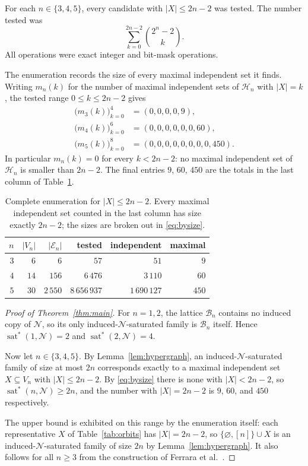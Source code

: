 \documentclass[11pt]{amsart}
\newcommand{\Bn}{\mathcal B_n}
\newcommand{\Nposet}{\mathcal N}
\newcommand{\satstar}{\operatorname{sat}^{*}}
\begin{document}
For each $n\in\{3,4,5\}$, every candidate with $|X|\leq 2n-2$ was tested.
The number tested was
\[
\sum_{k=0}^{2n-2}\binom{2^n-2}{k}.
\]
All operations were exact integer and bit-mask operations.

The enumeration records the size of every maximal independent set it finds.
Writing $m_n(k)$ for the number of maximal independent sets of $\mathcal H_n$
with $|X|=k$, the tested range $0\leq k\leq 2n-2$ gives
\begin{equation}\label{eq:bysize}
\begin{aligned}
\bigl(m_3(k)\bigr)_{k=0}^{4}&=(0,0,0,0,9),\\
\bigl(m_4(k)\bigr)_{k=0}^{6}&=(0,0,0,0,0,0,60),\\
\bigl(m_5(k)\bigr)_{k=0}^{8}&=(0,0,0,0,0,0,0,0,450).
\end{aligned}
\end{equation}
In particular $m_n(k)=0$ for every $k<2n-2$: no maximal independent set of
$\mathcal H_n$ is smaller than $2n-2$. The final entries $9$, $60$, $450$ are
the totals in the last column of Table~\ref{tab:census}.

\begin{table}[ht]
\centering
\begin{tabular}{@{}rrrrrr@{}}
\toprule
$n$ & $|V_n|$ & $|\mathcal E_n|$ & tested & independent & maximal \\
\midrule
$3$ & $6$  & $6$      & $57$           & $51$          & $9$   \\
$4$ & $14$ & $156$    & $6\,476$       & $3\,110$      & $60$  \\
$5$ & $30$ & $2\,550$ & $8\,656\,937$ & $1\,690\,127$ & $450$ \\
\bottomrule
\end{tabular}
\caption{Complete enumeration for $|X|\leq 2n-2$. Every maximal independent
set counted in the last column has size exactly $2n-2$; the sizes are broken
out in \eqref{eq:bysize}.}
\label{tab:census}
\end{table}

\begin{proof}[Proof of Theorem~\ref{thm:main}]
For $n=1,2$, the lattice $\Bn$ contains no induced copy of $\Nposet$, so its
only induced-$\Nposet$-saturated family is $\Bn$ itself. Hence
$\satstar(1,\Nposet)=2$ and $\satstar(2,\Nposet)=4$.

Now let $n\in\{3,4,5\}$. By Lemma~\ref{lem:hypergraph}, an
induced-$\Nposet$-saturated family of size at most $2n$ corresponds exactly to
a maximal independent set $X\subseteq V_n$ with $|X|\leq 2n-2$. By
\eqref{eq:bysize} there is none with $|X|<2n-2$, so $\satstar(n,\Nposet)\geq
2n$, and the number with $|X|=2n-2$ is $9$, $60$, and $450$ respectively.

The upper bound is exhibited on this range by the enumeration itself: each
representative $X$ of Table~\ref{tab:orbits} has $|X|=2n-2$, so
$\{\varnothing,[n]\}\cup X$ is an induced-$\Nposet$-saturated family of size
$2n$ by Lemma~\ref{lem:hypergraph}. It also follows for all $n\geq 3$ from the
construction of Ferrara et al.\ \cite[Proposition~2]{FerraraEtAl}.
\end{proof}
\end{document}
